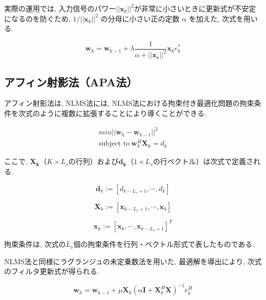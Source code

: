 実際の運用では, 入力信号のパワー\(||\bm{x}_k||^2\)が非常に小さいときに更新式が不安定になるのを防ぐため, \(
1 / ||{}\bm{x}_k||^2 \)
の分母に小さい正の定数 \(\alpha\) を加えた, 次式を用いる\cite{signal_processing_for_array}. 

\begin{equation}
\bm{w}_k = \bm{w}_{k-1} + \lambda \frac{1}{\alpha + ||\bm{x}_k||^2} \bm{x}_k e_k^*
\end{equation}

\subsection{アフィン射影法（APA法）}\label{apa}

アフィン射影法は, NLMS法には, NLMS法における拘束付き最適化問題の拘束条件を次式のように複数に拡張することにより導くことができる. 

\begin{equation}
\begin{split}
min ||\bm{w}_k - \bm{w}_{k-1}||^2 \\ 
\mbox{subject \ to} \ \bm{w}_k^H \bm{X}_k = d_k
\end{split}
\end{equation}


ここで, \(\bm{X_k}\)（\(K \times L_s\)の行列）および\(\bm{d_k}\)（\(1 \times L_s\)の行ベクトル）は次式で定義される. 


\begin{equation}
\bm{d}_k := [d_{k-L_s+1}, \cdots, d_k]
\end{equation}

\begin{equation}
\bm{X}_k := [\bm{x}_{k-L_s+1}, \cdots, \bm{x}_k]
\end{equation}

\begin{equation}
\bm{x}_k := [\bm{x}_{k}, \cdots, \bm{x}_{k-L_s+1}]^T
\end{equation}

拘束条件は, 次式の\(L_s\)個の拘束条件を行列・ベクトル形式で表したものである. 

NLMS法と同様にラグランジュの未定乗数法を用いた, 最適解を導出により, 次式のフィルタ更新式が得られる\cite{signal_processing_for_array}. 

\begin{equation}
\bm{w}_k = \bm{w}_{k-1} + \mu \bm{X}_k ( \alpha \bm{I} + \bm{X}_k^H \bm{X} )^{-1} e_k^H
\end{equation}



